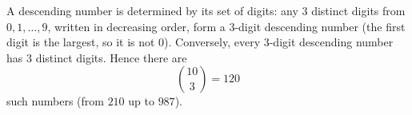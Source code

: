 A descending number is determined by its set of digits: any $3$ distinct digits from $0,1,\dots,9$, written in decreasing order, form a $3$-digit descending number (the first digit is the largest, so it is not $0$). Conversely, every $3$-digit descending number has $3$ distinct digits. Hence there are
\[
\binom{10}{3}=\boxed{120}
\]
such numbers (from $210$ up to $987$).
